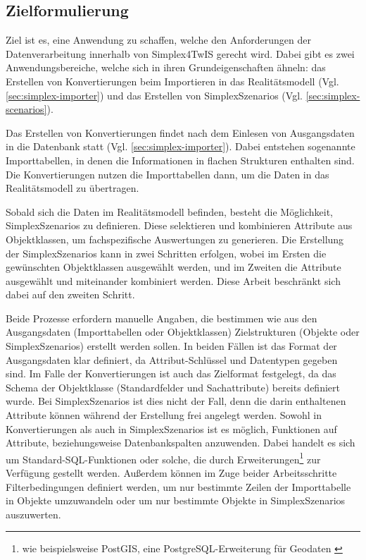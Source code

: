 \subsection{Zielformulierung}

Ziel ist es, eine Anwendung zu schaffen, welche den Anforderungen der Datenverarbeitung innerhalb von Simplex4TwIS gerecht wird. Dabei gibt es zwei Anwendungsbereiche, welche sich in ihren Grundeigenschaften ähneln: das Erstellen von Konvertierungen beim Importieren in das Realitätsmodell (Vgl. \ref{sec:simplex-importer}) und das Erstellen von SimplexSzenarios (Vgl. \ref{sec:simplex-scenarios}).

\pskip
Das Erstellen von Konvertierungen findet nach dem Einlesen von Ausgangsdaten in die Datenbank statt (Vgl. \ref{sec:simplex-importer}). Dabei entstehen sogenannte Importtabellen, in denen die Informationen in flachen Strukturen enthalten sind. Die Konvertierungen nutzen die Importtabellen dann, um die Daten in das Realitätsmodell zu übertragen.

Sobald sich die Daten im Realitätsmodell befinden, besteht die Möglichkeit, SimplexSzenarios zu definieren. Diese selektieren und kombinieren Attribute aus Objektklassen, um fachspezifische Auswertungen zu generieren. Die Erstellung der SimplexSzenarios kann in zwei Schritten erfolgen, wobei im Ersten die gewünschten Objektklassen ausgewählt werden, und im Zweiten die Attribute ausgewählt und miteinander kombiniert werden. Diese Arbeit beschränkt sich dabei auf den zweiten Schritt.

Beide Prozesse erfordern manuelle Angaben, die bestimmen wie aus den Ausgangsdaten (Importtabellen oder Objektklassen) Zielstrukturen (Objekte oder SimplexSzenarios) erstellt werden sollen. In beiden Fällen ist das Format der Ausgangsdaten klar definiert, da Attribut-Schlüssel und Datentypen gegeben sind. Im Falle der Konvertierungen ist auch das Zielformat festgelegt, da das Schema der Objektklasse (Standardfelder und Sachattribute) bereits definiert wurde. Bei SimplexSzenarios ist dies nicht der Fall, denn die darin enthaltenen Attribute können während der Erstellung frei angelegt werden. Sowohl in Konvertierungen als auch in SimplexSzenarios ist es möglich, Funktionen auf Attribute, beziehungsweise Datenbankspalten anzuwenden. Dabei handelt es sich um Standard-\ac{SQL}-Funktionen oder solche, die durch Erweiterungen\footnote{wie beispielsweise PostGIS, eine PostgreSQL-Erweiterung für Geodaten \parencite{postgispscPostGIS}} zur Verfügung gestellt werden. Außerdem können im Zuge beider Arbeitsschritte Filterbedingungen definiert werden, um nur bestimmte Zeilen der Importtabelle in Objekte umzuwandeln oder um nur bestimmte Objekte in SimplexSzenarios auszuwerten.

